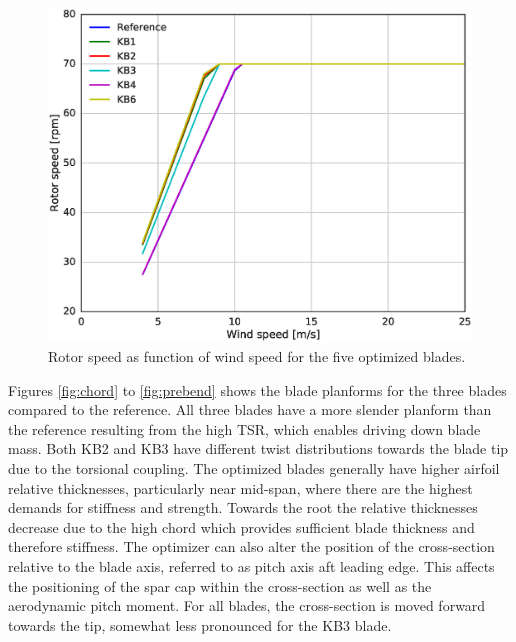 \begin{figure}[!ht]
\begin{center}
	\includegraphics[width=.85\linewidth]{figures/KBcomp_rpm.eps}
\end{center}
\caption{Rotor speed as function of wind speed for the five optimized blades.}
\label{fig:rpm}
\end{figure}

\clearpage

Figures \ref{fig:chord} to \ref{fig:prebend} shows the blade planforms for the three blades compared to the reference.
All three blades have a more slender planform than the reference resulting from the high TSR, which enables driving down blade mass.
Both KB2 and KB3 have different twist distributions towards the blade tip due to the torsional coupling.
The optimized blades generally have higher airfoil relative thicknesses, particularly near mid-span, where there are the highest demands for stiffness and strength.
Towards the root the relative thicknesses decrease due to the high chord which provides sufficient blade thickness and therefore stiffness.
The optimizer can also alter the position of the cross-section relative to the blade axis, referred to as pitch axis aft leading edge.
This affects the positioning of the spar cap within the cross-section as well as the aerodynamic pitch moment.
For all blades, the cross-section is moved forward towards the tip, somewhat less pronounced for the KB3 blade. 

